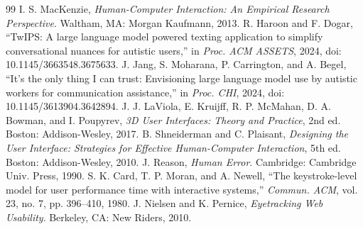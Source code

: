 \begin{thebibliography}{99}
 I. S. MacKenzie, \emph{Human-Computer Interaction: An Empirical Research Perspective}. Waltham, MA: Morgan Kaufmann, 2013.
 R. Haroon and F. Dogar, ``TwIPS: A large language model powered texting application to simplify conversational nuances for autistic users,'' in \emph{Proc. ACM ASSETS}, 2024, doi: 10.1145/3663548.3675633.
 J. Jang, S. Moharana, P. Carrington, and A. Begel, ``It's the only thing I can trust: Envisioning large language model use by autistic workers for communication assistance,'' in \emph{Proc. CHI}, 2024, doi: 10.1145/3613904.3642894.
 J. J. LaViola, E. Kruijff, R. P. McMahan, D. A. Bowman, and I. Poupyrev, \emph{3D User Interfaces: Theory and Practice}, 2nd ed. Boston: Addison-Wesley, 2017.
 B. Shneiderman and C. Plaisant, \emph{Designing the User Interface: Strategies for Effective Human-Computer Interaction}, 5th ed. Boston: Addison-Wesley, 2010.
 J. Reason, \emph{Human Error}. Cambridge: Cambridge Univ. Press, 1990.
 S. K. Card, T. P. Moran, and A. Newell, ``The keystroke-level model for user performance time with interactive systems,'' \emph{Commun. ACM}, vol. 23, no. 7, pp. 396--410, 1980.
 J. Nielsen and K. Pernice, \emph{Eyetracking Web Usability}. Berkeley, CA: New Riders, 2010.
\end{thebibliography}
